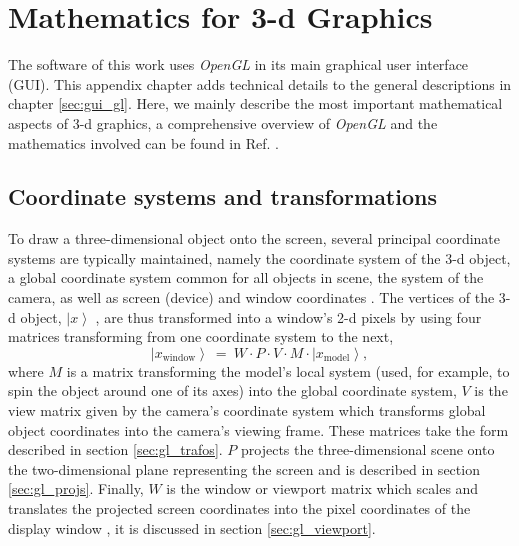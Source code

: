 %
%

\chapter{Mathematics for 3-d Graphics}
\label{ch:gl}

The software of this work uses \textit{OpenGL} \cite{web_OpenGL} in its main graphical user interface (GUI).
This appendix chapter adds technical details to the general descriptions in chapter \ref{sec:gui_gl}.
Here, we mainly describe the most important mathematical aspects of 3-d graphics, a comprehensive overview of 
\textit{OpenGL} and the mathematics involved can be found in Ref. \cite{Sellers2002}.



\section{Coordinate systems and transformations}
To draw a three-dimensional object onto the screen, several principal coordinate systems are typically maintained,
namely the coordinate system of the 3-d object, a global coordinate system common for all objects in scene, the
system of the camera, as well as screen (device) and window coordinates \cite[pp. 63-66]{Sellers2002}.
The vertices of the 3-d object, $\left|x\right>$ , are thus transformed into a window's 2-d pixels by using four
matrices transforming from one coordinate system to the next,
\begin{equation}
	\boxed{\left|x_{\mathrm{window}}\right> \ =\ W \cdot P \cdot V \cdot  M \cdot  \left| x_{\mathrm{model}} \right>,}
	\label{eq:gl_mvp}
\end{equation}
where $M$ is a matrix transforming the model's local system (used, for example, to spin the object around one of
its axes) into the global coordinate system, $V$ is the view matrix given by the camera's coordinate system
which transforms global object coordinates into the camera's viewing frame. These matrices take the form
described in section \ref{sec:gl_trafos}.
$P$ projects the three-dimensional scene onto the two-dimensional plane representing the screen \cite{web_gl_ortho, web_gl_perspective} and is described in section \ref{sec:gl_projs}. 
Finally, $W$ is the window or viewport matrix which scales and translates the projected screen coordinates 
into the pixel coordinates of the display window \cite{web_gl_viewport}, it is discussed in section \ref{sec:gl_viewport}.

